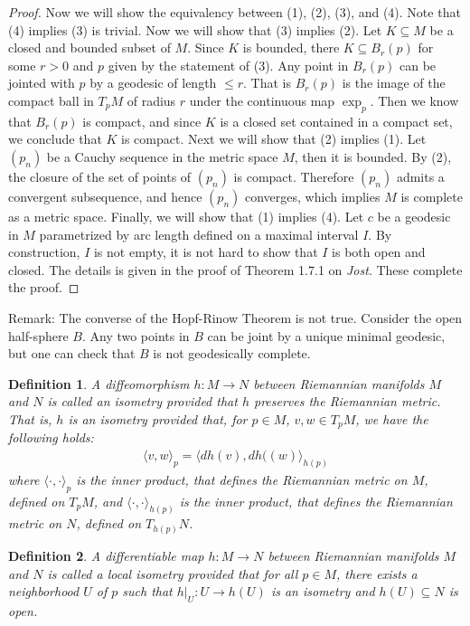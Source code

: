 \documentclass[11pt]{book}
\theoremstyle{break}
\theoremstyle{break}
\newtheorem{defn}{Definition}[corL]
\newcommand{\remark}{\color{blue}Remark: \color{black}}
\begin{document}
\begin{proof}
Now we will show the equivalency between (1), (2), (3), and (4). Note that (4) implies (3) is trivial. Now we will show that (3) implies (2). Let $K \subseteq M$ be a closed and bounded subset of $M$. Since $K$ is bounded, there $K \subseteq B_r(p)$ for some $r > 0$ and $p$ given by the statement of (3). Any point in $B_r(p)$ can be jointed with $p$ by a geodesic of length $\leq r$. That is $B_r(p)$ is the image of the compact ball in $T_pM$ of radius $r$ under the continuous map $\exp_p$. Then we know that $B_r(p)$ is compact, and since $K$ is a closed set contained in a compact set, we conclude that $K$ is compact. Next we will show that (2) implies (1). Let $(p_n)$ be a Cauchy sequence in the metric space $M$, then it is bounded.  By (2), the closure of the set of points of $(p_n)$ is compact. Therefore $(p_n)$ admits a convergent subsequence, and hence $(p_n)$ converges, which implies $M$ is complete as a metric space. Finally, we will show that (1) implies (4). Let $c$ be a geodesic in $M$ parametrized by arc length defined on a maximal interval $I$. By construction, $I$ is not empty, it is not hard to show that $I$ is both open and closed. The details is given in the proof of Theorem 1.7.1 on \textit{Jost}. These complete the proof. 
\end{proof}

\remark The converse of the Hopf-Rinow Theorem is not true. Consider the open half-sphere $B$. Any two points in $B$ can be joint by a unique minimal geodesic, but one can check that $B$ is not geodesically complete. \\

\begin{defn}
A diffeomorphism $h:M\to N$ between Riemannian manifolds $M$ and $N$ is called an isometry provided that $h$ preserves the Riemannian metric. That is, $h$ is an isometry provided that, for $p \in M$, $v,w \in T_pM$, we have the following holds:
\begin{align*}
\langle v,w\rangle_p = \langle dh(v), dh((w)\rangle_{h(p)}
\end{align*}
where $\langle \cdot, \cdot\rangle_p$ is the inner product, that defines the Riemannian metric on $M$, defined on $T_pM$, and $\langle \cdot,\cdot \rangle_{h(p)}$ is the inner product, that defines the Riemannian metric on $N$, defined on $T_{h(p)}N$. 
\end{defn}

\begin{defn}
A differentiable map $h:M \to N$ between Riemannian manifolds $M$ and $N$ is called a local isometry provided that for all $p \in M$, there exists a neighborhood $U$ of $p$ such that $h|_U:U \to h(U)$ is an isometry and $h(U)\subseteq N$ is open. 
\end{defn}
\end{document}
